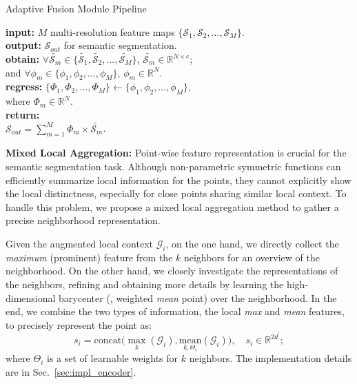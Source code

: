 \documentclass[10pt,twocolumn,letterpaper]{article}
\begin{document}
\begin{algorithm}\caption{Adaptive Fusion Module Pipeline}\label{alg:fusion}
\nonl\textbf{input:} $M$ multi-resolution feature maps $\{\mathcal{S}_1, \mathcal{S}_2, ..., \mathcal{S}_M\}$.\\
\nonl\textbf{output:} ${\mathcal{S}_{out}}$ for semantic segmentation.\\
\textbf{obtain:} ${\forall}\tilde{\mathcal{S}_m}\in \{\tilde{\mathcal{S}_1}, \tilde{\mathcal{S}_2}, ..., \tilde{\mathcal{S}_M}\}$, $\tilde{\mathcal{S}_m} \in\mathbb{R}^{N\times{c}}$;\\ 
\nonl and ${\forall}\phi_m\in \{\phi_1, \phi_2, ..., \phi_M\}$, $\phi_m \in\mathbb{R}^{N}$.\\
\textbf{regress:} $\{\Phi_1, \Phi_2, ..., \Phi_M\}\leftarrow \{\phi_1, \phi_2, ..., \phi_M\}$,\\
\nonl where $\Phi_m \in\mathbb{R}^{N}$.\\
\textbf{return:}\\
\nonl ${\mathcal{S}_{out}} = \sum_{m=1}^{M}{\Phi_m \times \tilde{\mathcal{S}_m}}$.\\
\end{algorithm}

\noindent \textbf{Mixed Local Aggregation:} Point-wise feature representation is crucial for the semantic segmentation task. Although non-parametric symmetric functions can efficiently summarize local information for the points, they cannot explicitly show the local distinctness, especially for close points sharing similar local context. To handle this problem, we propose a mixed local aggregation method to gather a precise neighborhood representation. 

Given the augmented local context $\mathcal{G}_i$, on the one hand, we directly collect the \emph{maximum} (prominent) feature from the $k$ neighbors for an overview of the neighborhood. On the other hand, we closely investigate the representations of the neighbors, refining and obtaining more details by learning the high-dimensional barycenter (\ie, weighted \emph{mean} point) over the neighborhood. In the end, we combine the two types of information, the local \emph{max} and \emph{mean} features, to precisely represent the point as:
\begin{equation}
\label{eq:mixed}
    s_i = \mathrm{concat}\Big(\max_{k}(\mathcal{G}_i), \underset{k,\Theta_i}{\mathrm{mean}}(\mathcal{G}_i)\Big),\quad {s_i}\in\mathbb{R}^{2d^\prime};
\end{equation}
where $\Theta_i$ is a set of learnable weights for $k$ neighbors. The implementation details are in Sec.~\ref{sec:impl_encoder}.
\end{document}

